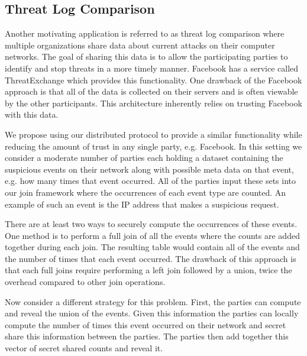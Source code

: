 
\subsection{Threat Log Comparison}\label{sec:threatlog}

Another motivating application is referred to as threat log comparison where multiple organizations share data about current attacks on their computer networks. The goal of sharing this data is to allow the participating parties to identify and stop threats in a more timely manner. Facebook has a service called ThreatExchange\cite{threat} which provides this functionality. One drawback of the Facebook approach is that all of the data is collected on their servers and is often viewable by the other participants. This architecture inherently relies on trusting Facebook with this data. 

We propose using our distributed protocol to provide a similar functionality while reducing the amount of trust in any single party, e.g. Facebook. In this setting we consider a moderate number of parties each holding a dataset containing the suspicious events on their network along with possible meta data on that event, e.g. how many times that event occurred. All of the parties input these sets into our join framework where the occurrences  of each event type are counted. An example of such an event is the IP address that makes a suspicious request. 

There are at least two ways to securely compute the occurrences of these events. One method is to perform a full join of all the events where the counts are added together during each join. The resulting table would contain all of the events and the number of times that each event occurred. The drawback of this approach is that each full joins require performing a left join followed by a union, twice the overhead compared to other join operations.

Now consider a different strategy for this problem.  First, the parties can compute and reveal the union of the events. Given this information the parties can locally compute the number of times this event occurred on their network and secret share this information between the parties. The parties then add together this vector of secret shared counts and reveal it.


